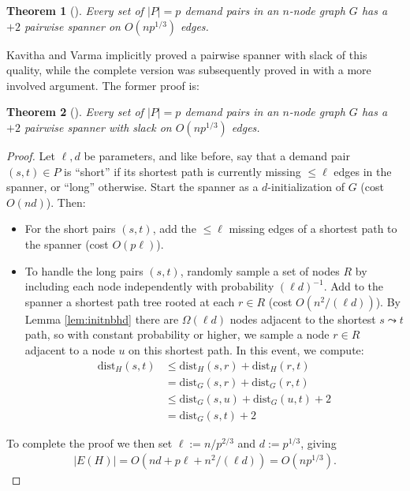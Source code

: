 \documentclass{article}
\newtheorem{theorem}{Theorem}
\newcommand{\dist}{\text{dist}}
\begin{document}
\begin{theorem} [\cite{KV15, AB16soda}] \label{thm:twospan}
Every set of $|P| = p$ demand pairs in an $n$-node graph $G$ has a $+2$ pairwise spanner on $O(np^{1/3})$ edges.
\end{theorem}
Kavitha and Varma \cite{KV15} implicitly proved a pairwise spanner with slack of this quality, while the complete version was subsequently proved in \cite{AB16soda} with a more involved argument.
The former proof is:
\begin{theorem} [\cite{KV15}]
Every set of $|P| = p$ demand pairs in an $n$-node graph $G$ has a $+2$ pairwise spanner with slack on $O(np^{1/3})$ edges.
\end{theorem}
\begin{proof}
Let $\ell, d$ be parameters, and like before, say that a demand pair $(s, t) \in P$ is ``short'' if its shortest path is currently missing $\le \ell$ edges in the spanner, or ``long'' otherwise.
Start the spanner as a $d$-initialization of $G$ (cost $O(nd)$).
Then:

\begin{itemize}
\item For the short pairs $(s, t)$, add the $\le \ell$ missing edges of a shortest path to the spanner (cost $O(p \ell)$).

\item To handle the long pairs $(s, t)$, randomly sample a set of nodes $R$ by including each node independently with probability $(\ell d)^{-1}$.
Add to the spanner a shortest path tree rooted at each $r \in R$ (cost $O(n^2/(\ell d))$).
By Lemma \ref{lem:initnbhd} there are $\Omega(\ell d)$ nodes adjacent to the shortest $s \leadsto t$ path, so with constant probability or higher, we sample a node $r \in R$ adjacent to a node $u$ on this shortest path.
In this event, we compute:
\begin{align*}
\dist_H(s, t) &\le \dist_H(s, r) + \dist_H(r, t) \tag*{triangle inequality}\\
&= \dist_G(s, r) + \dist_G(r, t) \tag*{shortest path tree at $r$}\\
&\le \dist_G(s, u) + \dist_G(u, t) + 2 \tag*{triangle inequality}\\
&= \dist_G(s, t) + 2 \tag*{$u$ on shortest $s \leadsto t$ path.}
\end{align*}
\end{itemize}

To complete the proof we then set $\ell := n/p^{2/3}$ and $d := p^{1/3}$, giving
\begin{align*}
|E(H)| = O\left(nd + p\ell + n^2/(\ell d)\right) = O\left(np^{1/3} \right). \tag*{\qedhere}
\end{align*}
\end{proof}
\end{document}
